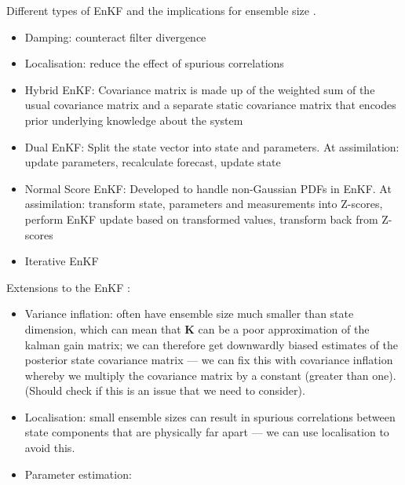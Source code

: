 Different types of EnKF and the implications for ensemble size
\citep{keller2018comparing}.
\begin{itemize}
    \item Damping: counteract filter divergence
    \item Localisation: reduce the effect of spurious correlations
    \item Hybrid EnKF: Covariance matrix is made up of the weighted sum of the
        usual covariance matrix and a separate static covariance matrix that
        encodes prior underlying knowledge about the system
    \item Dual EnKF: Split the state vector into state and parameters. At
        assimilation: update parameters, recalculate forecast, update state
    \item Normal Score EnKF: Developed to handle non-Gaussian PDFs in EnKF. At
        assimilation: transform state, parameters and measurements into
        Z-scores, perform EnKF update based on transformed values, transform
        back from Z-scores
    \item Iterative EnKF
\end{itemize}

Extensions to the EnKF \cite{katzfuss2016understanding}:
\begin{itemize}
    \item Variance inflation: often have ensemble size much smaller than state
        dimension, which can mean that $\mathbf{K}$ can be a poor approximation
        of the kalman gain matrix; we can therefore get downwardly biased
        estimates of the posterior state covariance matrix ---  we can fix this
        with covariance inflation whereby we multiply the covariance matrix by a
        constant (greater than one). (Should check if this is an issue that we
        need to consider).
    \item Localisation: small ensemble sizes can result in spurious
        correlations between state components that are physically far apart ---
        we can use localisation to avoid this.
    \item Parameter estimation: 
\end{itemize}

